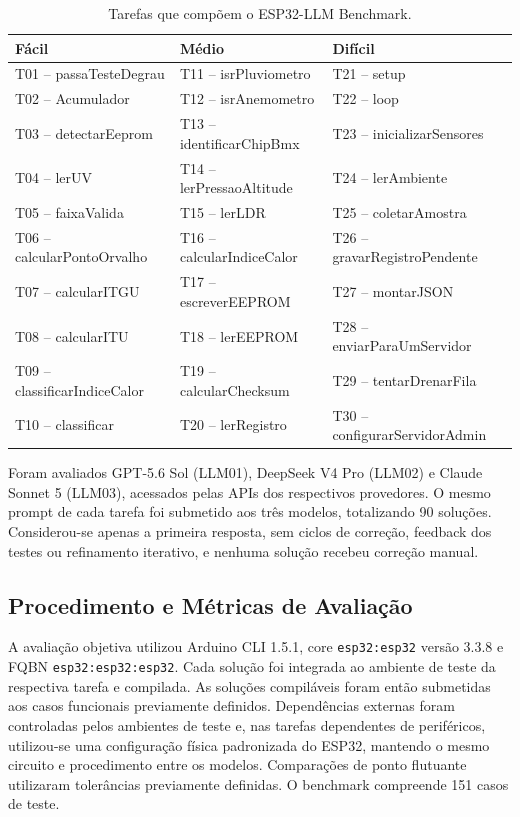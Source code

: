 \documentclass[12pt]{article}
\begin{document}
\begin{table}[ht]
\centering
\caption{Tarefas que compõem o ESP32-LLM Benchmark.}
\label{tab:tarefas}
\small
\begin{tabular}{lll}
\hline
\textbf{Fácil} & \textbf{Médio} & \textbf{Difícil} \\
\hline
T01 -- passaTesteDegrau       & T11 -- isrPluviometro          & T21 -- setup \\
T02 -- Acumulador             & T12 -- isrAnemometro           & T22 -- loop \\
T03 -- detectarEeprom         & T13 -- identificarChipBmx      & T23 -- inicializarSensores \\
T04 -- lerUV                  & T14 -- lerPressaoAltitude      & T24 -- lerAmbiente \\
T05 -- faixaValida            & T15 -- lerLDR                  & T25 -- coletarAmostra \\
T06 -- calcularPontoOrvalho   & T16 -- calcularIndiceCalor     & T26 -- gravarRegistroPendente \\
T07 -- calcularITGU           & T17 -- escreverEEPROM          & T27 -- montarJSON \\
T08 -- calcularITU            & T18 -- lerEEPROM               & T28 -- enviarParaUmServidor \\
T09 -- classificarIndiceCalor & T19 -- calcularChecksum        & T29 -- tentarDrenarFila \\
T10 -- classificar            & T20 -- lerRegistro             & T30 -- configurarServidorAdmin \\
\hline
\end{tabular}
\end{table}

Foram avaliados GPT-5.6 Sol (LLM01), DeepSeek V4 Pro (LLM02) e Claude Sonnet 5 (LLM03), acessados pelas APIs dos respectivos provedores. O mesmo prompt de cada tarefa foi submetido aos três modelos, totalizando 90 soluções. Considerou-se apenas a primeira resposta, sem ciclos de correção, feedback dos testes ou refinamento iterativo, e nenhuma solução recebeu correção manual.

\subsection{Procedimento e Métricas de Avaliação}
\label{sec:procedimento}

A avaliação objetiva utilizou Arduino CLI 1.5.1, core \texttt{esp32:esp32} versão 3.3.8 e FQBN \texttt{esp32:esp32:esp32}. Cada solução foi integrada ao ambiente de teste da respectiva tarefa e compilada. As soluções compiláveis foram então submetidas aos casos funcionais previamente definidos. Dependências externas foram controladas pelos ambientes de teste e, nas tarefas dependentes de periféricos, utilizou-se uma configuração física padronizada do ESP32, mantendo o mesmo circuito e procedimento entre os modelos. Comparações de ponto flutuante utilizaram tolerâncias previamente definidas. O benchmark compreende 151 casos de teste.
\end{document}
